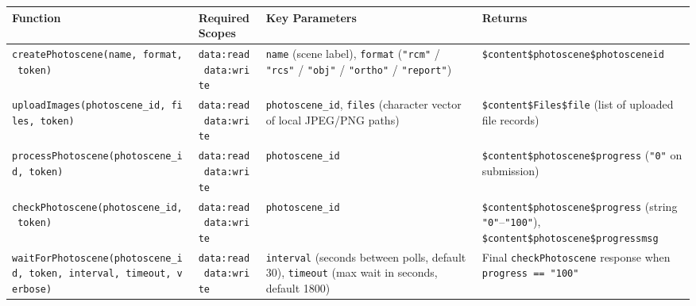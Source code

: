 \documentclass[
  11pt,
  letterpaper,
  DIV=11,
  numbers=noendperiod]{scrreprt}
\begin{document}
\begin{longtable}[]{@{}
  >{\raggedright\arraybackslash}p{}
  >{\raggedright\arraybackslash}p{}
  >{\raggedright\arraybackslash}p{}
  >{\raggedright\arraybackslash}p{}@{}}
\toprule\noalign{}
\begin{minipage}[b]{\linewidth}\raggedright
Function
\end{minipage} & \begin{minipage}[b]{\linewidth}\raggedright
Required Scopes
\end{minipage} & \begin{minipage}[b]{\linewidth}\raggedright
Key Parameters
\end{minipage} & \begin{minipage}[b]{\linewidth}\raggedright
Returns
\end{minipage} \\
\midrule\noalign{}
\endhead
\bottomrule\noalign{}
\endlastfoot
\texttt{createPhotoscene(name,\ format,\ token)} &
\texttt{data:read\ data:write} & \texttt{name} (scene label),
\texttt{format} (\texttt{"rcm"} / \texttt{"rcs"} / \texttt{"obj"} /
\texttt{"ortho"} / \texttt{"report"}) &
\texttt{\$content\$photoscene\$photosceneid} \\
\texttt{uploadImages(photoscene\_id,\ files,\ token)} &
\texttt{data:read\ data:write} & \texttt{photoscene\_id}, \texttt{files}
(character vector of local JPEG/PNG paths) &
\texttt{\$content\$Files\$file} (list of uploaded file records) \\
\texttt{processPhotoscene(photoscene\_id,\ token)} &
\texttt{data:read\ data:write} & \texttt{photoscene\_id} &
\texttt{\$content\$photoscene\$progress} (\texttt{"0"} on submission) \\
\texttt{checkPhotoscene(photoscene\_id,\ token)} &
\texttt{data:read\ data:write} & \texttt{photoscene\_id} &
\texttt{\$content\$photoscene\$progress} (string
\texttt{"0"}--\texttt{"100"}),
\texttt{\$content\$photoscene\$progressmsg} \\
\texttt{waitForPhotoscene(photoscene\_id,\ token,\ interval,\ timeout,\ verbose)}
& \texttt{data:read\ data:write} & \texttt{interval} (seconds between
polls, default 30), \texttt{timeout} (max wait in seconds, default 1800)
& Final \texttt{checkPhotoscene} response when
\texttt{progress\ ==\ "100"} \\
\end{longtable}
\end{document}

